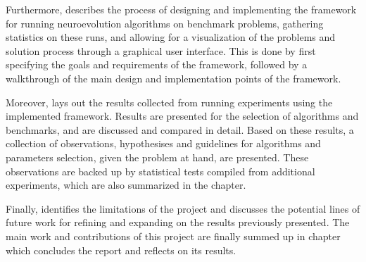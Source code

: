 Furthermore,  describes the process of designing and implementing the framework for running neuroevolution algorithms on benchmark problems,
gathering statistics on these runs, and allowing for a visualization of the problems and solution process through a graphical user interface. This is done by first
specifying the goals and requirements of the framework, followed by a walkthrough of the main design and implementation points of the framework.

Moreover,  lays out the results collected from running experiments using the implemented framework.
Results are presented for the selection of algorithms and benchmarks, and are discussed and compared in detail. Based on these results, a collection of
observations, hypothesises and guidelines for algorithms and parameters selection, given the problem at hand, are presented. These observations are
backed up by statistical tests compiled from additional experiments, which are also summarized in the chapter.

Finally,  identifies the limitations of the project and discusses the potential lines of future work for refining and expanding on the results
previously presented. The main work and contributions of this project are finally summed up in chapter  which concludes the report and reflects on its
results.
